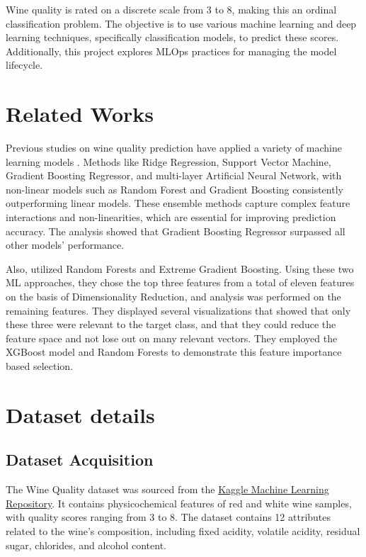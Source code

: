 \documentclass[10pt,twocolumn,letterpaper]{article}
\begin{document}
Wine quality is rated on a discrete scale from 3 to 8, making this an ordinal classification problem. The objective is to use various machine learning and deep learning techniques, specifically classification models, to predict these scores. Additionally, this project explores MLOps practices for managing the model lifecycle.

\section{Related Works}

Previous studies on wine quality prediction have applied a variety of machine learning models \cite{dahal2021}. Methods like Ridge Regression, Support Vector Machine, Gradient Boosting Regressor, and multi-layer Artificial Neural Network, with non-linear models such as Random Forest and Gradient Boosting consistently outperforming linear models. These ensemble methods capture complex feature interactions and non-linearities, which are essential for improving prediction accuracy. The analysis
showed that Gradient Boosting Regressor surpassed all other models’ performance.

Also, \cite{jain2023} utilized Random Forests and Extreme Gradient Boosting. Using these two ML approaches, they chose the top three features from a total of eleven features on the basis of Dimensionality Reduction, and analysis was performed on the
remaining features. They displayed several visualizations that showed that only these three were relevant to the target class, and that they could reduce the feature space and not lose out on many relevant vectors. They employed the XGBoost model and Random Forests to demonstrate this feature importance based selection.

\section{Dataset details}

\subsection{Dataset Acquisition}
The Wine Quality dataset was sourced from the \href{https://www.kaggle.com/datasets/yasserh/wine-quality-datasety}{Kaggle Machine Learning Repository}. It contains physicochemical features of red and white wine samples, with quality scores ranging from 3 to 8. The dataset contains 12 attributes related to the wine’s composition, including fixed acidity, volatile acidity, residual sugar, chlorides, and alcohol content.
\end{document}
